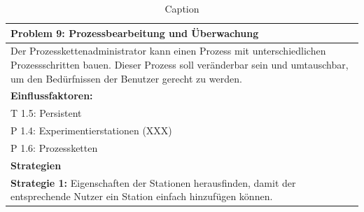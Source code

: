\documentclass[enabledeprecatedfontcommands,fontsize=12pt,paper=a4,twoside]{scrartcl}
\begin{document}
\begin{table}[H]
    \centering
    \begin{tabular}{|p{15cm}|}
    \hline
          \textbf{Problem 9:} Prozessbearbeitung und Überwachung
          \\ \hline
          Der Prozesskettenadministrator kann einen Prozess mit unterschiedlichen Prozessschritten bauen. Dieser Prozess soll veränderbar sein und umtauschbar, um den Bedürfnissen der Benutzer gerecht zu werden.
          \\ \hline
          \textbf{Einflussfaktoren: } \\
          T 1.5: Persistent \\
          P 1.4: Experimentierstationen (XXX)\\
          P 1.6: Prozessketten\\
          \hline
          \textbf{Strategien} \\ \hline
          \textbf{Strategie 1:} Eigenschaften der Stationen herausfinden, damit der entsprechende Nutzer ein Station einfach hinzufügen können.
          \\ \hline
    \end{tabular}

    \caption{Caption}
    \label{tab:my_label}
\end{table}
\end{document}
